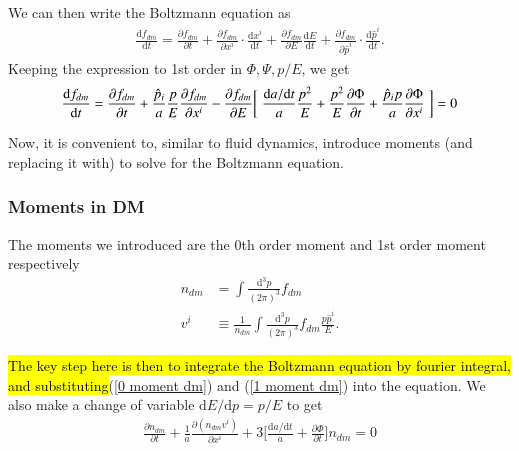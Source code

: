 \documentclass[a4paper, 12pt]{article}
\begin{document}
{{   We can then write the Boltzmann equation as 
   \begin{align}
    \label{Boltzmann equation}
     \frac{\mathrm{d}f_{dm }}{\mathrm{d}t} = \frac{\partial f_{dm
     }}{\partial t} + \frac{\partial f_{dm }}{\partial x^{i} } \cdot
     \frac{\mathrm{d}x^{i} }{\mathrm{d}t} + \frac{\partial f_{dm
     }}{\partial E} \frac{\mathrm{d}E}{\mathrm{d}t} + \frac{\partial
     f_{dm }}{\partial \hat{p}^{i} } \cdot
     \frac{\mathrm{d}\hat{p}^{i} }{\mathrm{d}t}.  
   \end{align} Keeping the expression to 1st order in \( \Phi, \Psi, p/E
   \), we get 
   \begin{align}
    \label{1st order of DM}
     \frac{\mathrm{d}f_{dm }}{\mathrm{d}t} = \frac{\partial f_{dm
     }}{\partial t}  + \frac{\hat{p}_{i}}{a} \frac{p}{E} \frac{\partial
     f_{dm }}{\partial x^{i} } - \frac{\partial f_{dm }}{\partial
     E} \bigg[\hspace{0.1cm}\frac{\mathrm{d}a / \mathrm{d}t}{a} \frac{p^2}{E} +
     \frac{p^2}{E} \frac{\partial \Phi}{\partial t} +
     \frac{\hat{p}_{i} p }{a} \frac{\partial \Phi}{\partial x^{i} }
     \hspace{0.1cm}\bigg] = 0
   \end{align}

   Now, it is convenient to, similar to fluid dynamics, introduce
   moments (and replacing it with) to solve for the Boltzmann equation. 

    \subsubsection{Moments in DM}%
      \label{sub:Moments in DM}
      The moments we introduced are the 0th order moment and 1st order
      moment respectively
      \begin{align}
        \label{0 moment dm}
        n_{dm } &= \int \frac{\mathrm{d}^{3} p}{(2 \pi)^{3}} f_{dm
        } \\ 
        \label{1 moment dm}
        v^{i} &\equiv \frac{1}{n_{dm}} \int \frac{\mathrm{d}^{3} p}{(2
        \pi)^{3}} f_{dm } \frac{p \hat{p}^{i} }{E}.
      \end{align}
    
    \hl{The key step here is then to integrate the Boltzmann equation
    by fourier integral, and substituting}(\ref{0 moment dm}) and
    (\ref{1 moment dm})  into the equation. We also make a change of
    variable \( \mathrm{d}E /\mathrm{d}p = p/E  \) to get 
    \begin{align}
      \label{DM Boltzmann in moments}
      \frac{\partial n_{dm }}{\partial t} + \frac{1}{a} \frac{\partial
      (n_{dm }v^{i} )}{\partial x^i} + 3
      \bigg[\frac{\mathrm{d}a/\mathrm{d}t}{a} + \frac{\partial
      \Phi}{\partial t}  \bigg] n_{dm } = 0 
    \end{align}

}}
\end{document}
